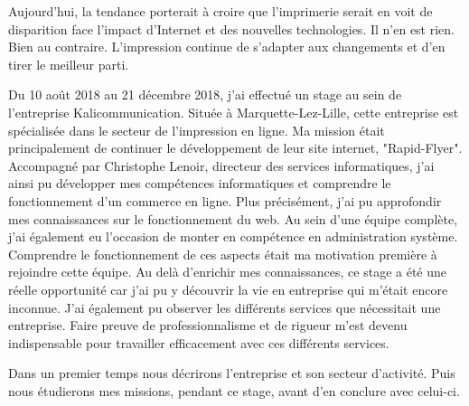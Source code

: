 Aujourd'hui, la tendance porterait à croire que l'imprimerie serait en voit de disparition face l'impact d'Internet et des nouvelles technologies. Il n'en est rien. Bien au contraire. L'impression continue de s'adapter aux changements et d'en tirer le meilleur parti.\newline

Du 10 août 2018 au 21 décembre 2018, j'ai effectué un stage au sein de l'entreprise Kalicommunication.
Située à Marquette-Lez-Lille, cette entreprise est spécialisée dans le secteur de l'impression en ligne.\newline
Ma mission était principalement de continuer le développement de leur site internet, "Rapid-Flyer".
Accompagné par Christophe Lenoir, directeur des services informatiques, j'ai ainsi pu développer mes compétences informatiques et comprendre le fonctionnement d'un commerce en ligne. Plus précisément, j'ai pu approfondir mes connaissances sur le fonctionnement du web. Au sein d'une équipe complète, j'ai également eu l'occasion de monter en compétence en administration système. Comprendre le fonctionnement de ces aspects était ma motivation première à rejoindre cette équipe.\newline
Au delà d'enrichir mes connaissances, ce stage a été une réelle opportunité car j'ai pu y découvrir la vie en entreprise qui m'était encore inconnue. J'ai également pu observer les différents services que nécessitait une entreprise. Faire preuve de professionnalisme et de rigueur m'est devenu indispensable pour travailler efficacement avec ces différents services.\newline

Dans un premier temps nous décrirons l'entreprise et son secteur d'activité. Puis nous étudierons mes missions, pendant ce stage, avant d'en conclure avec celui-ci.